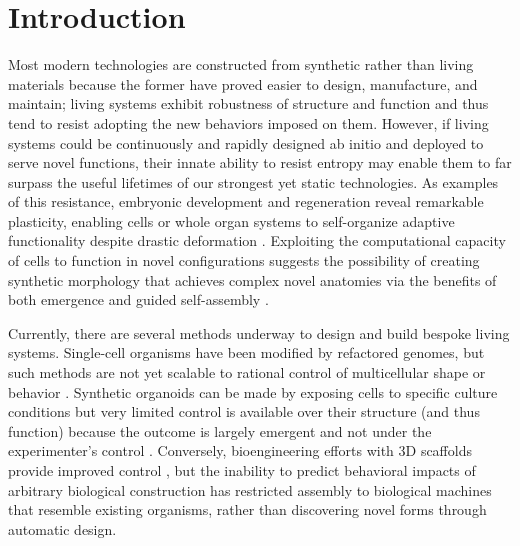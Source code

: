 



\section{Introduction}

Most modern technologies are constructed from synthetic rather than living materials because the former have proved easier to design, manufacture, and maintain; living systems exhibit robustness of structure and function and thus tend to resist adopting the new behaviors imposed on them. 
However, if living systems could be continuously and rapidly designed ab initio and deployed to serve novel functions, their innate ability to resist entropy may enable them to far surpass the useful lifetimes of our strongest yet static technologies. 
As examples of this resistance, embryonic development and regeneration reveal remarkable plasticity, enabling cells or whole organ systems to self-organize adaptive functionality despite drastic deformation \cite{blackiston2013ectopic,vandenberg2012normalized}. 
Exploiting the computational capacity of cells to function in novel configurations suggests the possibility of creating synthetic morphology that achieves complex novel anatomies via the benefits of both emergence and guided self-assembly \cite{kamm2018perspective}.

Currently, there are several methods underway to design and build bespoke living systems. Single-cell organisms have been modified by refactored genomes, but such methods are not yet scalable to rational control of multicellular shape or behavior \cite{hutchison2016design}. 
Synthetic organoids can be made by exposing cells to specific culture conditions but very limited control is available over their structure (and thus function) because the outcome is largely emergent and not under the experimenter's control \cite{sasai2012vitro}. 
Conversely, bioengineering efforts with 3D scaffolds provide improved control \cite{park2016phototactic,tang2014bioengineered,nawroth2012tissue}, but the inability to predict behavioral impacts of arbitrary biological construction has restricted assembly to biological machines that resemble existing organisms, rather than discovering novel forms through automatic design.

